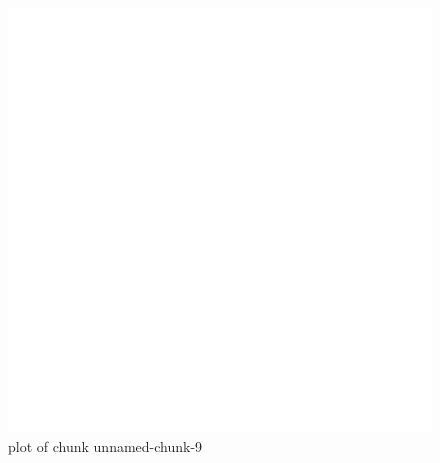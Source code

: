 \begin{Shaded}
\begin{Highlighting}[]
\NormalTok{(}\NormalTok{(}\NormalTok{(} \NormalTok{, }
     \NormalTok{)}
\NormalTok{(} \NormalTok{, } \NormalTok{)}
\end{Highlighting}
\end{Shaded}
\begin{figure}[htbp]
\centering
\includegraphics{figure/unnamed-chunk-9.png}
\caption{plot of chunk unnamed-chunk-9}
\end{figure}

